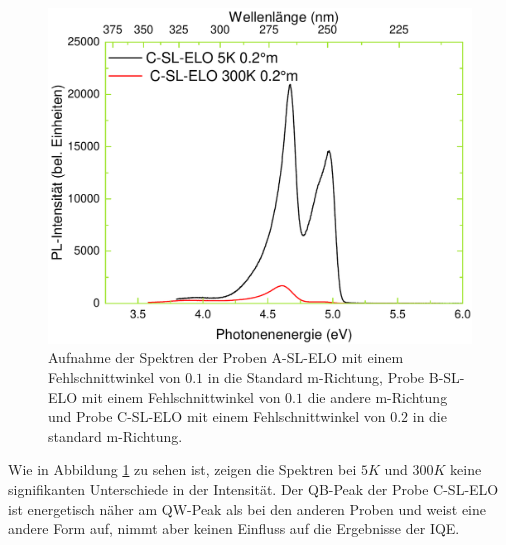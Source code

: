 \begin{figure}[htb]
\begin{minipage}[t]{0.49\textwidth}
    \includegraphics[width=\linewidth]{Bilder/TS4048/cslelo.pdf}
  \end{minipage}
	\caption{Aufnahme der Spektren der Proben A-SL-ELO mit einem Fehlschnittwinkel von $0.1$ in die Standard m-Richtung, Probe B-SL-ELO mit einem Fehlschnittwinkel von $0.1$ die andere m-Richtung und Probe C-SL-ELO mit einem Fehlschnittwinkel von $0.2$ in die standard m-Richtung. }
	\label{fig:spectrassl}
\end{figure}
\noindent 
\newline
Wie in Abbildung \ref{fig:spectrassl} zu sehen ist, zeigen die Spektren bei $5K$ und $300K$ keine signifikanten Unterschiede in der Intensität. Der QB-Peak der Probe C-SL-ELO ist energetisch näher am QW-Peak als bei den anderen Proben und weist eine andere Form auf, nimmt aber keinen Einfluss auf die Ergebnisse der IQE. 
